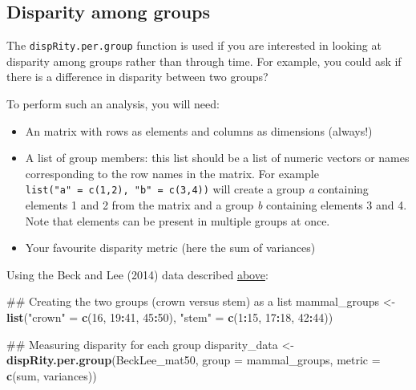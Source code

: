 \documentclass[]{book}
\newenvironment{Shaded}{\begin{snugshade}}{\end{snugshade}}
\newcommand{\KeywordTok}[1]{\textcolor[rgb]{0.13,0.29,0.53}{\textbf{#1}}}
\newcommand{\DataTypeTok}[1]{\textcolor[rgb]{0.13,0.29,0.53}{#1}}
\newcommand{\DecValTok}[1]{\textcolor[rgb]{0.00,0.00,0.81}{#1}}
\newcommand{\StringTok}[1]{\textcolor[rgb]{0.31,0.60,0.02}{#1}}
\newcommand{\OperatorTok}[1]{\textcolor[rgb]{0.81,0.36,0.00}{\textbf{#1}}}
\newcommand{\NormalTok}[1]{#1}
\providecommand{\tightlist}{%
  \setlength{\itemsep}{0pt}\setlength{\parskip}{0pt}}
\theoremstyle{definition}
\theoremstyle{definition}
\theoremstyle{remark}
\begin{document}
\hypertarget{disparity-among-groups}{\subsection{Disparity among
groups}\label{disparity-among-groups}}

The \texttt{dispRity.per.group} function is used if you are interested
in looking at disparity among groups rather than through time. For
example, you could ask if there is a difference in disparity between two
groups?

To perform such an analysis, you will need:

\begin{itemize}
\tightlist
\item
  An matrix with rows as elements and columns as dimensions (always!)
\item
  A list of group members: this list should be a list of numeric vectors
  or names corresponding to the row names in the matrix. For example
  \texttt{list("a"\ =\ c(1,2),\ "b"\ =\ c(3,4))} will create a group
  \emph{a} containing elements 1 and 2 from the matrix and a group
  \emph{b} containing elements 3 and 4. Note that elements can be
  present in multiple groups at once.
\item
  Your favourite disparity metric (here the sum of variances)
\end{itemize}

Using the Beck and Lee (2014) data described
\protect\hyperlink{example-data}{above}:

\begin{Shaded}
\begin{Highlighting}[]
\NormalTok{## Creating the two groups (crown versus stem) as a list}
\NormalTok{mammal_groups <-}\StringTok{ }\KeywordTok{list}\NormalTok{(}\StringTok{"crown"}\NormalTok{ =}\StringTok{ }\KeywordTok{c}\NormalTok{(}\DecValTok{16}\NormalTok{, }\DecValTok{19}\OperatorTok{:}\DecValTok{41}\NormalTok{, }\DecValTok{45}\OperatorTok{:}\DecValTok{50}\NormalTok{),}
                      \StringTok{"stem"}\NormalTok{ =}\StringTok{ }\KeywordTok{c}\NormalTok{(}\DecValTok{1}\OperatorTok{:}\DecValTok{15}\NormalTok{, }\DecValTok{17}\OperatorTok{:}\DecValTok{18}\NormalTok{, }\DecValTok{42}\OperatorTok{:}\DecValTok{44}\NormalTok{))}

\NormalTok{## Measuring disparity for each group}
\NormalTok{disparity_data <-}\StringTok{ }\KeywordTok{dispRity.per.group}\NormalTok{(BeckLee_mat50, }\DataTypeTok{group =}\NormalTok{ mammal_groups,}
                                     \DataTypeTok{metric =} \KeywordTok{c}\NormalTok{(sum, variances))}
\end{Highlighting}
\end{Shaded}
\end{document}
